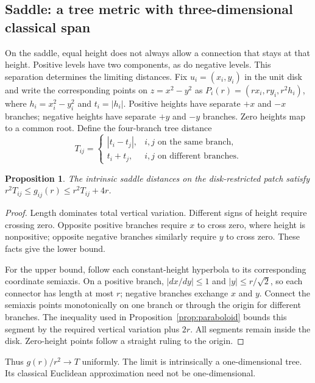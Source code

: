 \documentclass[11pt]{article}
\newtheorem{proposition}{Proposition}
\begin{document}
\subsection{Saddle: a tree metric with three-dimensional classical span}
On the saddle, equal height does not always allow a connection that stays at
that height. Positive levels have two components, as do negative levels.
This separation determines the limiting distances. Fix $u_i=(x_i,y_i)$ in the
unit disk and write the corresponding points on $z=x^2-y^2$ as
$P_i(r)=(rx_i,ry_i,r^2h_i)$, where $h_i=x_i^2-y_i^2$ and $t_i=|h_i|$.
Positive heights have separate $+x$ and $-x$
branches; negative heights have separate $+y$ and $-y$ branches. Zero heights
map to a common root. Define the four-branch tree distance
\begin{equation}
 T_{ij}=\begin{cases}|t_i-t_j|,&i,j\text{ on the same branch},\\
 t_i+t_j,&i,j\text{ on different branches}.
 \end{cases}\label{eq:tree}
\end{equation}
\begin{proposition}\label{prop:saddle}
The intrinsic saddle distances on the disk-restricted patch satisfy
$r^2T_{ij}\le g_{ij}(r)\le r^2T_{ij}+4r$.
\end{proposition}
\begin{proof}
Length dominates total vertical variation. Different signs of height require
crossing zero. Opposite positive branches require $x$ to cross zero, where
height is nonpositive; opposite negative branches similarly require $y$ to
cross zero. These facts give the lower bound.

For the upper bound, follow each constant-height hyperbola to its corresponding
coordinate semiaxis. On a positive branch, $|dx/dy|\le1$ and
$|y|\le r/\sqrt2$, so each connector has length at most $r$; negative branches
exchange $x$ and $y$. Connect the semiaxis points monotonically on one branch
or through the origin for different branches. The inequality used in
Proposition~\ref{prop:paraboloid} bounds this segment by the required vertical
variation plus $2r$. All segments remain inside the disk. Zero-height points
follow a straight ruling to the origin.
\end{proof}
Thus $g(r)/r^2\to T$ uniformly. The limit is intrinsically a one-dimensional
tree. Its classical Euclidean approximation need not be one-dimensional.
\end{document}
